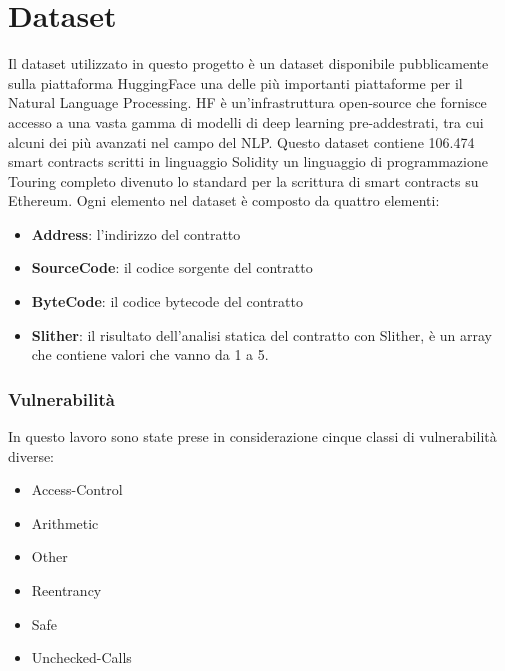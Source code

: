 \documentclass[../../Thesis.tex]{subfiles}
\begin{document}
\chapter{Dataset}
Il dataset \cite{rossini2022slitherauditedcontracts} utilizzato in questo progetto è un dataset disponibile pubblicamente sulla piattaforma HuggingFace una delle più importanti piattaforme per il Natural Language Processing. HF è un'infrastruttura open-source che fornisce accesso a una vasta gamma di modelli di deep learning pre-addestrati, tra cui alcuni dei più avanzati nel campo del NLP.
Questo dataset contiene 106.474 smart contracts scritti in linguaggio Solidity un linguaggio di programmazione Touring completo divenuto lo standard per la scrittura di smart contracts su Ethereum. Ogni elemento nel dataset è composto da quattro elementi:
\begin{itemize}
    \item  \textbf{Address}: l'indirizzo del contratto
    \item  \textbf{SourceCode}: il codice sorgente del contratto
    \item  \textbf{ByteCode}: il codice bytecode del contratto
    \item  \textbf{Slither}: il risultato dell'analisi statica del contratto con Slither, è un array che contiene valori che vanno da 1 a 5. 
\end{itemize}
\subsection{Vulnerabilità}
In questo lavoro sono state prese in considerazione cinque classi di vulnerabilità diverse: 
\begin{itemize}
    \item Access-Control
    \item Arithmetic
    \item Other
    \item Reentrancy
    \item Safe
    \item Unchecked-Calls
\end{itemize}
    
\end{document}
